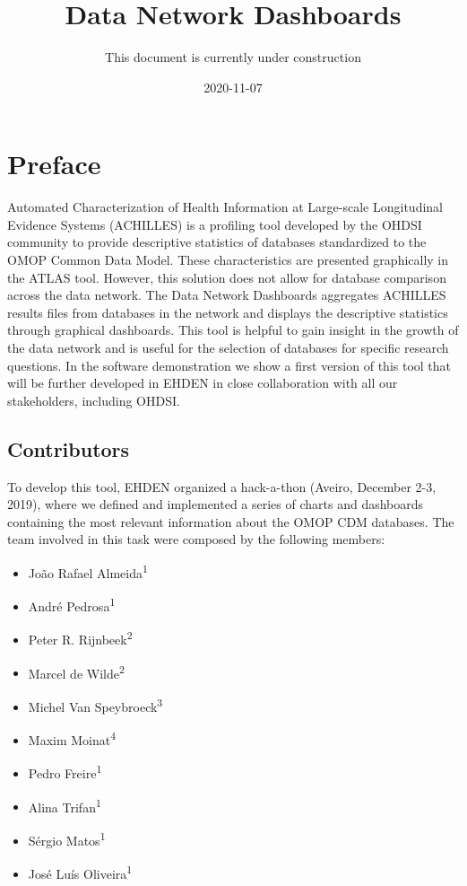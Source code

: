 \documentclass[
]{book}
\title{Data Network Dashboards}
\author{This document is currently under construction}
\date{2020-11-07}
\providecommand{\tightlist}{%
  \setlength{\itemsep}{0pt}\setlength{\parskip}{0pt}}
\begin{document}
\maketitle

{
\setcounter{tocdepth}{1}
\tableofcontents
}
\hypertarget{preface}{%
\chapter*{Preface}\label{preface}}

Automated Characterization of Health Information at Large-scale Longitudinal Evidence Systems (ACHILLES) is a profiling tool developed by the OHDSI community to provide descriptive statistics of databases standardized to the OMOP Common Data Model. These characteristics are presented graphically in the ATLAS tool. However, this solution does not allow for database comparison across the data network. The Data Network Dashboards aggregates ACHILLES results files from databases in the network and displays the descriptive statistics through graphical dashboards. This tool is helpful to gain insight in the growth of the data network and is useful for the selection of databases for specific research questions. In the software demonstration we show a first version of this tool that will be further developed in EHDEN in close collaboration with all our stakeholders, including OHDSI.

\hypertarget{contributors}{%
\section*{Contributors}\label{contributors}}

To develop this tool, EHDEN organized a hack-a-thon (Aveiro, December 2-3, 2019), where we defined and implemented a series of charts and dashboards containing the most relevant information about the OMOP CDM databases. The team involved in this task were composed by the following members:

\begin{itemize}
\tightlist
\item
  João Rafael Almeida\textsuperscript{1}
\item
  André Pedrosa\textsuperscript{1}
\item
  Peter R. Rijnbeek\textsuperscript{2}
\item
  Marcel de Wilde\textsuperscript{2}
\item
  Michel Van Speybroeck\textsuperscript{3}
\item
  Maxim Moinat\textsuperscript{4}
\item
  Pedro Freire\textsuperscript{1}
\item
  Alina Trifan\textsuperscript{1}
\item
  Sérgio Matos\textsuperscript{1}
\item
  José Luís Oliveira\textsuperscript{1}
\end{itemize}
\end{document}
